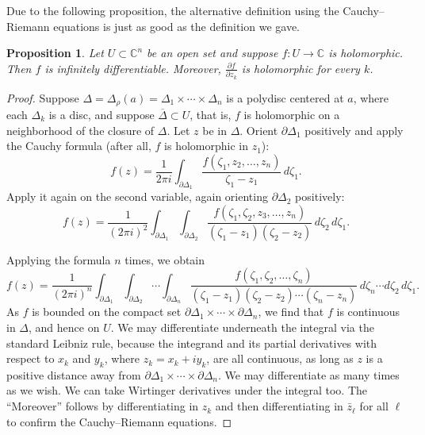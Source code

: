 \documentclass[12pt,openany]{book}
\newcommand{\C}{{\mathbb{C}}}
\theoremstyle{plain}
\newtheorem{prop}[thm]{Proposition}
\theoremstyle{remark}
\theoremstyle{definition}
\theoremstyle{exercise}
\theoremstyle{example}
\begin{document}
Due to the following proposition, the alternative definition using the
Cauchy--Riemann equations is just as good as the definition we gave.

\begin{prop}
Let $U \subset \C^n$ be an open set and
suppose $f \colon U \to \C$ is holomorphic.  Then $f$ is infinitely
differentiable.
Moreover, $\frac{\partial f}{\partial z_k}$ is holomorphic for every $k$.
\end{prop}

\begin{proof}
Suppose $\Delta = \Delta_{\rho}(a) = \Delta_1 \times \cdots \times \Delta_n$
is a polydisc centered at $a$, where each $\Delta_k$ is a disc,
and suppose $\overline{\Delta} \subset U$, that is, $f$ is holomorphic
on a neighborhood of the closure of $\Delta$.
Let $z$ be in $\Delta$.
Orient $\partial \Delta_1$ positively and
apply the Cauchy formula (after all, $f$ is holomorphic in $z_1$):
\begin{equation*}
f(z) =
\frac{1}{2\pi i}
\int_{\partial \Delta_1}
\frac{f(\zeta_1,z_2,\ldots,z_n)}{\zeta_1-z_1}
\,
d \zeta_1 .
\end{equation*}
Apply it again on the second variable, again orienting
$\partial \Delta_2$ positively:
\begin{equation*}
f(z) =
\frac{1}{{(2\pi i)}^2}
\int_{\partial \Delta_1}
\int_{\partial \Delta_2}
\frac{f(\zeta_1,\zeta_2,z_3,\ldots,z_n)}{(\zeta_1-z_1)(\zeta_2-z_2)}
\,
d \zeta_2
\,
d \zeta_1 .
\end{equation*}

Applying the formula $n$ times, we obtain
\begin{equation} \label{iteratedcauchy:eq}
f(z) =
\frac{1}{{(2\pi i)}^n}
\int_{\partial \Delta_1}
\int_{\partial \Delta_2}
\cdots
\int_{\partial \Delta_n}
\frac{f(\zeta_1,\zeta_2,\ldots,\zeta_n)}{(\zeta_1-z_1)(\zeta_2-z_2)\cdots(\zeta_n-z_n)}
\,
d \zeta_n
\cdots
d \zeta_2
\,
d \zeta_1 .
\end{equation}
As $f$ is bounded on the compact set
$\partial \Delta_1 \times \cdots \times \partial \Delta_n$,
we find that $f$ is continuous in $\Delta$, and hence on $U$.
We may differentiate underneath the
integral via the standard Leibniz rule,
because the integrand and its partial derivatives
with respect to $x_k$ and $y_k$, where $z_k=x_k+i y_k$, are
all continuous, as long as $z$
is a positive distance away from
$\partial \Delta_1 \times \cdots \times \partial \Delta_n$.
We may differentiate as many times as we wish.
We can take Wirtinger derivatives under the integral too.
The ``Moreover'' follows by differentiating in $z_k$
and then differentiating in $\bar{z}_\ell$
for all $\ell$ to confirm the Cauchy--Riemann equations.
\end{proof}
\end{document}

